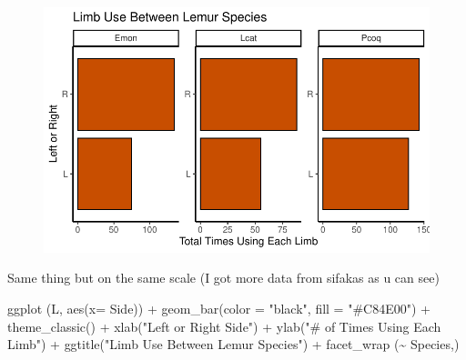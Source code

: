 \documentclass[
  letterpaper,
  DIV=11,
  numbers=noendperiod]{scrartcl}
\newenvironment{Shaded}{\begin{snugshade}}{\end{snugshade}}
\newcommand{\AttributeTok}[1]{\textcolor[rgb]{0.40,0.45,0.13}{#1}}
\newcommand{\FunctionTok}[1]{\textcolor[rgb]{0.28,0.35,0.67}{#1}}
\newcommand{\NormalTok}[1]{\textcolor[rgb]{0.00,0.23,0.31}{#1}}
\newcommand{\SpecialCharTok}[1]{\textcolor[rgb]{0.37,0.37,0.37}{#1}}
\newcommand{\StringTok}[1]{\textcolor[rgb]{0.13,0.47,0.30}{#1}}
\begin{document}
\begin{figure}[H]

{\centering \includegraphics{LeftyLemurs_files/figure-pdf/unnamed-chunk-18-1.pdf}

}

\end{figure}

Same thing but on the same scale (I got more data from sifakas as u can
see)

\begin{Shaded}
\begin{Highlighting}[]
\FunctionTok{ggplot}\NormalTok{ (L, }\FunctionTok{aes}\NormalTok{(}\AttributeTok{x=}\NormalTok{ Side)) }\SpecialCharTok{+}
  \FunctionTok{geom\_bar}\NormalTok{(}\AttributeTok{color =} \StringTok{"black"}\NormalTok{, }\AttributeTok{fill =} \StringTok{"\#C84E00"}\NormalTok{) }\SpecialCharTok{+}
  \FunctionTok{theme\_classic}\NormalTok{() }\SpecialCharTok{+}
  \FunctionTok{xlab}\NormalTok{(}\StringTok{"Left or Right Side"}\NormalTok{) }\SpecialCharTok{+}
  \FunctionTok{ylab}\NormalTok{(}\StringTok{"\# of Times Using Each Limb"}\NormalTok{) }\SpecialCharTok{+}
  \FunctionTok{ggtitle}\NormalTok{(}\StringTok{"Limb Use Between Lemur Species"}\NormalTok{) }\SpecialCharTok{+}
  \FunctionTok{facet\_wrap}\NormalTok{ (}\SpecialCharTok{\textasciitilde{}}\NormalTok{ Species,)}
\end{Highlighting}
\end{Shaded}
\end{document}
